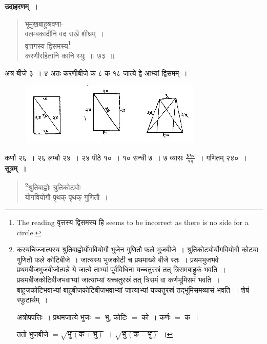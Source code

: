 \documentclass[11pt, openany]{book}
\begin{document}
 \textbf{उदाहरणम्~।} 
\begin{quote}
    \bqt 
भूमुखबाहुश्रवणा-\\
वलम्बकादीनि वद सखे शीघ्रम्~।\\
वृत्तगस्य द्विसमस्य\footnote{The reading वृत्तस्य द्विसमस्य हि seems to be incorrect as there is no side for a circle.} \\
करणीरहितानि कानि स्युः~॥~७३~॥
\end{quote}
\newpage%
 अत्र बीजे ३~। ४ अतः करणीबीजे क ८ क १८ जात्ये द्वे आभ्यां 
द्विसमम्~। 
\vspace{-2mm}

\begin{figure}[h!]
    \centering
    \includegraphics[scale=0.85]{graphics/capture106.png}
\end{figure}
\vspace{-2mm}
 
कर्णौ २६~। २६ लम्बौ २४~। २४ पीठे १०~। १० सन्धी ७~। ७ व्यासः $\frac{\mbox{३१०}}{\mbox{१२}}$~। गणितम् २४०~। \\

\textbf{सूत्रम्~।} 
\begin{quote}
    \bs 
     \footnote{कस्यचिज्जात्यस्य श्रुतिबाह्वोर्योगवियोगौ भुजेन गुणितौ फले भुजबीजे~। श्रुतिकोट्योर्योगवियोगौ कोट्या गुणितौ फले कोटिबीजे~। जात्यस्य भुजकोटी च प्रथमाख्ये बीजे स्तः~। प्रथमभुजभवे प्रथमबीजभुजबीजोत्पन्ने ये जात्ये
ताभ्यां पूर्वविधिना यच्चतुरस्रं तत् त्रिसमबाहुकं भवति~। 
प्रथमबीजकोटिबीजभवाभ्यां जात्याभ्यां यच्चतुरस्रं तत् त्रिसमं वा
कर्णभूमिसमं भवति~। बाहुजकोटिभवाभ्यां बाहुबीजकोटिबीजभवाभ्यां जात्याभ्यां
यच्चतुरस्रं तद्भूमिसमव्यासं भवति~। शेषं स्फुटार्थम्~। 
\vspace{1mm}

\hspace{3mm} अत्रोपपत्तिः~। प्रथमजात्ये भुजः $=$ भु, कोटिः $=$ को~। कर्णः $=$ क~। 
\vspace{1mm}

ततो भुजबीजे $= \sqrt{\mbox{भु}\,(\mbox{क} + \mbox{भु})}$~। $\sqrt{\mbox{भु}\,(\mbox{क} - \mbox{भु})}$~।}श्रुतिबाह्वोः श्रुतिकोट्योः\\
योगवियोगौ पृथक् पृथक् गुणितौ~।
\end{quote}
\newpage %
\end{document}
